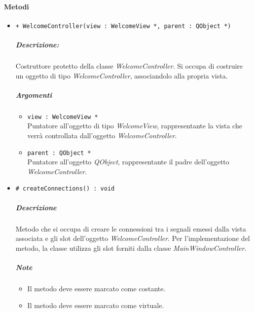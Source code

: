 	\paragraph{\color{black}Metodi}
		\begin{itemize}
			\item \color{blue} \verb!+ WelcomeController(view : WelcomeView *, parent : QObject *)!
			\color{black}
			\subparagraph{Descrizione:} Costruttore protetto della classe \textsl{WelcomeController}. Si occupa di costruire un oggetto di tipo \textsl{WelcomeController}, associandolo alla propria vista.
			\color{black}
			\subparagraph{Argomenti}
			\begin{itemize}
				\item \color{RoyalPurple} \verb!view : WelcomeView *!\\				
\color{black} Puntatore all'oggetto di tipo \textsl{WelcomeView}, rappresentante la vista che verrà controllata dall'oggetto \textsl{WelcomeController}.
				\item \color{RoyalPurple} \verb!parent : QObject *!\\				
\color{black} Puntatore all'oggetto \textsl{QObject}, rappresentante il padre dell'oggetto \textsl{WelcomeController}.
			\end{itemize}
			\item \color{blue} \verb!# createConnections() : void!
			\color{black}
			\subparagraph{Descrizione} Metodo che si occupa di creare le connessioni tra i segnali emessi dalla vista associata e gli slot\g{} dell'oggetto \textsl{WelcomeController}. Per l'implementazione del metodo, la classe utilizza gli slot forniti dalla classe \textsl{MainWindowController}.
			\subparagraph{Note}
			\begin{itemize}
				\item Il metodo deve essere marcato come costante.
				\item Il metodo deve essere marcato come virtuale.
			\end{itemize}
		\end{itemize}\begin{flushleft}
\end{flushleft}